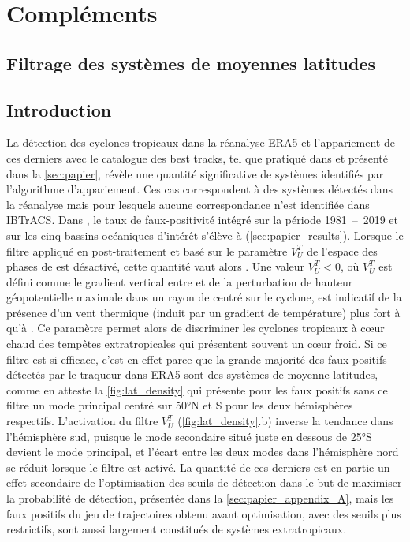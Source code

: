 \documentclass[../main.tex]{subfiles}
\begin{document}
\section{Compléments}\label{sec:complements_papier}

\subsection{Filtrage des systèmes de moyennes latitudes}\label{sec:filtrage_mid_latitudes}

\subsection*{Introduction}

La détection des cyclones tropicaux dans la réanalyse ERA5 et l'appariement de ces derniers avec le catalogue des best tracks, tel que pratiqué dans
\textcite{dulac_assessing_2023} et présenté dans la \cref{sec:papier}, révèle une quantité significative de systèmes identifiés  par
l'algorithme d'appariement. Ces cas correspondent à des systèmes détectés dans la réanalyse mais pour lesquels aucune correspondance n'est identifiée dans
IBTrACS. Dans \textcite{dulac_assessing_2023}, le taux de faux-positivité intégré sur la période \num{1981}~--~\num{2019} et sur les cinq bassins océaniques
d'intérêt s'élève à  (\cref{sec:papier_results}). Lorsque le filtre appliqué en post-traitement et basé sur le paramètre $V_U^T$ de l'espace des phases
de \textcite{hart_cyclone_2003} est désactivé, cette quantité vaut alors . Une valeur $V_U^T < 0$, où $V_U^T$ est défini comme le gradient vertical entre
 et  de la perturbation de hauteur géopotentielle maximale dans un rayon de  centré sur le cyclone, est indicatif de la présence d'un
vent thermique (induit par un gradient de température) plus fort à  qu'à . Ce paramètre permet alors de discriminer les cyclones tropicaux à
cœur chaud des tempêtes extratropicales qui présentent souvent un cœur froid. Si ce filtre est si efficace, c'est en effet parce que la grande majorité des
faux-positifs détectés par le traqueur dans ERA5 sont des systèmes de moyenne latitudes, comme en atteste la \cref{fig:lat_density} qui présente pour les faux
positifs sans ce filtre un mode principal centré sur \ang{50}N et S pour les deux hémisphères respectifs. L'activation du filtre $V_U^T$
(\cref{fig:lat_density}.b) inverse la tendance dans l'hémisphère sud, puisque le mode secondaire situé juste en dessous de \ang{25}S devient le mode principal,
et l'écart entre les deux modes dans l'hémisphère nord se réduit lorsque le filtre est activé. La quantité de ces derniers est en partie un effet secondaire de
l'optimisation des seuils de détection dans le but de maximiser la probabilité de détection, présentée dans la \cref{sec:papier_appendix_A}, mais les faux
positifs du jeu de trajectoires obtenu avant optimisation, avec des seuils plus restrictifs, sont aussi largement constitués de systèmes extratropicaux.
\end{document}
